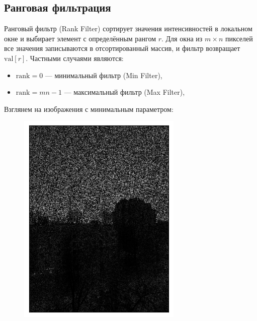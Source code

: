 \documentclass[a4paper,12pt]{article}
\begin{document}
\subsection{Ранговая фильтрация}
Ранговый фильтр (Rank Filter) сортирует значения интенсивностей в локальном окне и выбирает элемент с определённым рангом \(r\). Для окна из \(m\times n\) пикселей все значения записываются в отсортированный массив, и фильтр возвращает \(\mathrm{val}[r]\). Частными случаями являются:
\begin{itemize}
    \item \(\mathrm{rank}=0\) --- минимальный фильтр (Min Filter),
    \item \(\mathrm{rank}=mn-1\) --- максимальный фильтр (Max Filter),
\end{itemize}
Взглянем на изображения с минимальным параметром:
\begin{figure}[H]
    \begin{minipage}{0.49\textwidth}
        \centering \includegraphics[width=\textwidth]{results/nlf_sap_3.png}

\end{minipage}
\end{figure}
\end{document}
